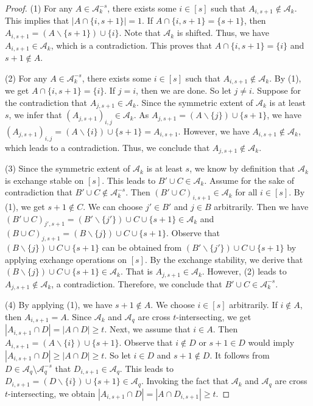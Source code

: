 \documentclass[11pt,a4paper]{article}
\begin{document}
\begin{proof}
(1) For any $A \in \mathcal{A}_k^{-s}$, there exists some $i\in [s]$
such that $
A_{i,s+1} \notin \mathcal{A}_k$. This implies that $|A\cap \{i,s+1\}|=1$. If 
$A\cap \{i,s+1\}=\{s+1\}$, then $A_{i,s+1}=(A \backslash\{s+1\}) \cup\{i\} $. Note that $ \mathcal{A}_k$ is shifted.
Thus, we have $A_{i,s+1}\in  \mathcal{A}_k$, which is a contradiction. This proves that 
$A\cap \{i,s+1\}=\{i\}$ and $s+1\notin A$.

(2) For any $A \in \mathcal{A}_k^{-s}$, there exists some $i\in [s]$
such that $
A_{i,s+1} \notin \mathcal{A}_k$. By (1), we get $A\cap \{i,s+1\}=\{i\}$.
If $j=i$, then we are done. So  let $j\neq i$.
Suppose for the contradiction that $A_{j,s+1} \in \mathcal{A}_k$. 
Since the symmetric extent of $\mathcal{A}_k$ is at least $s$, we infer that $(A_{j,s+1})_{i,j}\in \mathcal{A}_k$.
As $A_{j,s+1}=(A \backslash\{j\}) \cup\{s+1\} $, we have
$(A_{j,s+1})_{i,j}=(A \backslash\{i\}) \cup\{s+1\}=A_{i,s+1}$. However, we have $ A_{i,s+1}\notin \mathcal{A}_k$, which leads to a contradiction. Thus, we conclude that 
$A_{j,s+1} \notin \mathcal{A}_k$.

(3) Since the symmetric extent of $\mathcal{A}_k$ is at least $s$, we know by definition that $\mathcal{A}_k$ is exchange stable on $[s]$. This leads to 
$B' \cup C \in \mathcal{A}_k$. Assume for the sake of contradiction that $B' \cup C\notin \mathcal{A}_k^{-s}$. Then $(B' \cup C)_{i,s+1} \in \mathcal{A}_k$ for all $i\in[s]$.
By (1), we get $s+1\notin C$.
We can choose $j'\in B'$ and $j\in B$ arbitrarily. Then we have
$(B' \cup C)_{j', s+1}=(B' \backslash\{j'\}) \cup C\cup\{s+1\}\in \mathcal{A}_k$ and 
$(B \cup C)_{j, s+1}=(B \backslash\{j\}) \cup C\cup\{s+1\}$. 
Observe that $(B \backslash\{j\}) \cup C\cup\{s+1\}$  can be  obtained from
 $(B' \backslash\{j'\}) \cup C\cup\{s+1\}$
 by applying exchange operations on $[s]$.
By the exchange stability, we derive that $(B \backslash\{j\}) \cup C\cup\{s+1\}\in \mathcal{A}_k$.
That is  ${ A_{j, s+1}\in \mathcal{A}_k}$.
However, (2) leads to $A_{j, s+1}\notin \mathcal{A}_k$, a contradiction.
Therefore, we conclude that $B' \cup C\in \mathcal{A}_k^{-s}$.

(4) By applying (1), we have $s + 1 \notin A$. We choose $i\in [s]$ arbitrarily.
If $i\notin A$, then $A_{i,s+1}=A $. Since $\mathcal{A}_k$ and $\mathcal{A}_q$ are cross $t$-intersecting, we get $ |A_{i,s+1} \cap D|=|A\cap D| \geq  t$.
Next, we assume that $i\in A$.
Then
$A_{i,s+1}=(A \backslash\{i\}) \cup\{s+1\}$. Observe that $i\notin D$ or $s+1\in D$ would imply $ |A_{i,s+1} \cap D|\geq  |A\cap D| \geq  t$.
So  let  $i\in D$ and $s+1\notin D$.
It follows from $D \in \mathcal{A}_q \setminus \mathcal{A}_q^{-s}$
that $D_{i,s+1}\in\mathcal{A}_q $. This leads to  $D_{i,s+1}=(D \backslash\{i\}) \cup\{s+1\}\in\mathcal{A}_q $. Invoking the fact that $\mathcal{A}_k$ and $\mathcal{A}_q$ are cross $t$-intersecting, we obtain $ |A_{i,s+1} \cap D|= |A\cap D_{i,s+1}| \geq  t$.


\end{proof}
\end{document}
